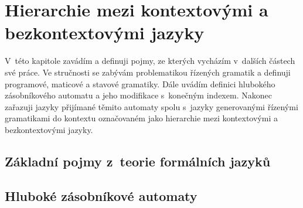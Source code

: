 

\chapter{Hierarchie mezi kontextovými a bezkontextovými jazyky}

V~této kapitole zavádím a definuji pojmy, ze kterých vycházím v~dalších částech své práce. Ve stručnosti se zabývám problematikou řízených gramatik a definuji programové, maticové a stavové gramatiky. Dále uvádím definici hlubokého zásobníkového automatu a jeho modifikace s~konečným indexem. Nakonec zařazuji jazyky přijímané těmito automaty spolu s~jazyky generovanými řízenými gramatikami do kontextu označovaném jako hierarchie mezi kontextovými a bezkontextovými jazyky.

\section{Základní pojmy z~teorie formálních jazyků}


\section{Hluboké zásobníkové automaty}


